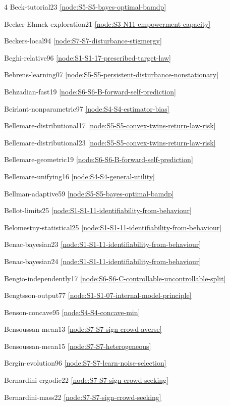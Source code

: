 \documentclass[10pt]{article}
\begin{document}
{\begin{multicols}{4}
Beck-tutorial23 \hfill \ref{node:S5-S5-bayes-optimal-bamdp}\par
Becker-Ehmck-exploration21 \hfill \ref{node:S3-N11-empowerment-capacity}\par
Beckers-local94 \hfill \ref{node:S7-S7-disturbance-stigmergy}\par
Beghi-relative96 \hfill \ref{node:S1-S1-17-prescribed-target-law}\par
Behrens-learning07 \hfill \ref{node:S5-S5-persistent-disturbance-nonstationary}\par
Behzadian-fast19 \hfill \ref{node:S6-S6-B-forward-self-prediction}\par
Beirlant-nonparametric97 \hfill \ref{node:S4-S4-estimator-bias}\par
Bellemare-distributional17 \hfill \ref{node:S5-S5-convex-twins-return-law-risk}\par
Bellemare-distributional23 \hfill \ref{node:S5-S5-convex-twins-return-law-risk}\par
Bellemare-geometric19 \hfill \ref{node:S6-S6-B-forward-self-prediction}\par
Bellemare-unifying16 \hfill \ref{node:S4-S4-general-utility}\par
Bellman-adaptive59 \hfill \ref{node:S5-S5-bayes-optimal-bamdp}\par
Bellot-limits25 \hfill \ref{node:S1-S1-11-identifiability-from-behaviour}\par
Belomestny-statistical25 \hfill \ref{node:S1-S1-11-identifiability-from-behaviour}\par
Benac-bayesian23 \hfill \ref{node:S1-S1-11-identifiability-from-behaviour}\par
Benac-bayesian24 \hfill \ref{node:S1-S1-11-identifiability-from-behaviour}\par
Bengio-independently17 \hfill \ref{node:S6-S6-C-controllable-uncontrollable-split}\par
Bengtsson-output77 \hfill \ref{node:S1-S1-07-internal-model-principle}\par
Benson-concave95 \hfill \ref{node:S4-S4-concave-min}\par
Bensoussan-mean13 \hfill \ref{node:S7-S7-sign-crowd-averse}\par
Bensoussan-mean15 \hfill \ref{node:S7-S7-heterogeneous}\par
Bergin-evolution96 \hfill \ref{node:S7-S7-learn-noise-selection}\par
Bernardini-ergodic22 \hfill \ref{node:S7-S7-sign-crowd-seeking}\par
Bernardini-mass22 \hfill \ref{node:S7-S7-sign-crowd-seeking}\par

\end{multicols}}
\end{document}
